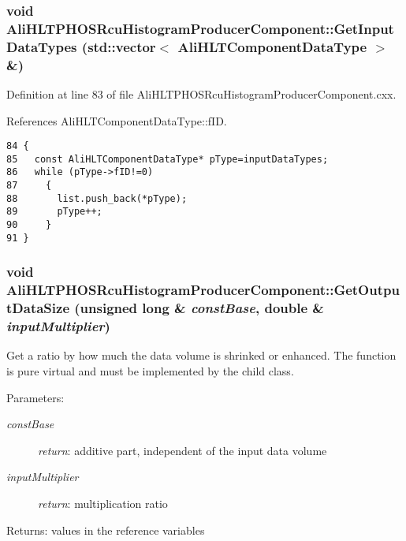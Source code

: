 \subsubsection{\setlength{\rightskip}{0pt plus 5cm}void Ali\-HLTPHOSRcu\-Histogram\-Producer\-Component::Get\-Input\-Data\-Types (std::vector$<$ {\bf Ali\-HLTComponent\-Data\-Type} $>$ \&)\hspace{0.3cm}{\tt  [virtual]}}\label{classAliHLTPHOSRcuHistogramProducerComponent_a6}




Definition at line 83 of file Ali\-HLTPHOSRcu\-Histogram\-Producer\-Component.cxx.

References Ali\-HLTComponent\-Data\-Type::f\-ID.

\footnotesize\begin{verbatim}84 {
85   const AliHLTComponentDataType* pType=inputDataTypes;
86   while (pType->fID!=0) 
87     {
88       list.push_back(*pType);
89       pType++;
90     }
91 }
\end{verbatim}\normalsize 


\subsubsection{\setlength{\rightskip}{0pt plus 5cm}void Ali\-HLTPHOSRcu\-Histogram\-Producer\-Component::Get\-Output\-Data\-Size (unsigned long \& {\em const\-Base}, double \& {\em input\-Multiplier})\hspace{0.3cm}{\tt  [virtual]}}\label{classAliHLTPHOSRcuHistogramProducerComponent_a8}


Get a ratio by how much the data volume is shrinked or enhanced. The function is pure virtual and must be implemented by the child class. \begin{Desc}
\item[Parameters:]
\begin{description}
\item[{\em const\-Base}]{\em return\/}: additive part, independent of the input data volume \item[{\em input\-Multiplier}]{\em return\/}: multiplication ratio \end{description}
\end{Desc}
\begin{Desc}
\item[Returns:]values in the reference variables \end{Desc}


